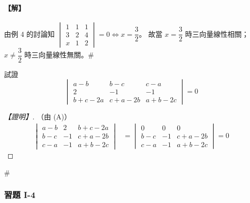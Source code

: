 \paragraph{【解】}
由例 4 的討論知 $\begin{vmatrix} 1 & 1 & 1 \\ 3 & 2 & 4 \\ x & 1 & 2 \end{vmatrix} = 0 \iff x = \dfrac{3}{2}$。
故當 $x = \dfrac{3}{2}$ 時三向量線性相關；$x \ne \dfrac{3}{2}$ 時三向量線性無關。\hfill$\#$

\begin{example}\label{ex:b6s-1-21}
試證
\[ \begin{vmatrix}
a-b & b-c & c-a \\
2 & -1 & -1 \\
b+c-2a & c+a-2b & a+b-2c
\end{vmatrix} = 0 \]
\end{example}

\begin{proof}[【證明】]
（由 (A)）
\begin{align*}
\begin{vmatrix}
a-b & 2 & b+c-2a \\
b-c & -1 & c+a-2b \\
c-a & -1 & a+b-2c
\end{vmatrix}
&= \begin{vmatrix}
0 & 0 & 0 \\
b-c & -1 & c+a-2b \\
c-a & -1 & a+b-2c
\end{vmatrix} = 0
\end{align*}
\end{proof}\hfill$\#$

\subsubsection*{習題 I-4}\label{sec:b6s-ex1-4}

